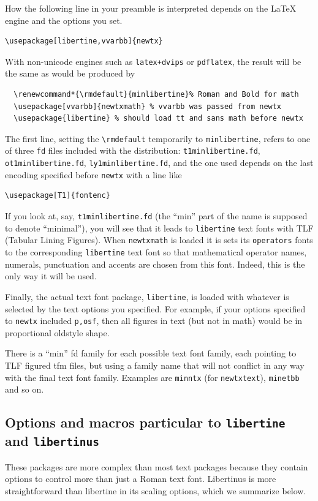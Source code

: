 \documentclass[\fsc]{article}
\theoremstyle{oldplain}
\theoremstyle{plain}
\begin{document}
How the following line in your preamble is interpreted depends on the LaTeX engine and the options you set. 
\begin{verbatim}
\usepackage[libertine,vvarbb]{newtx}
\end{verbatim}
With non-unicode engines such as {\tt latex+dvips} or {\tt pdflatex}, the result will be the same as would be produced by
\begin{verbatim}
  \renewcommand*{\rmdefault}{minlibertine}% Roman and Bold for math
  \usepackage[vvarbb]{newtxmath} % vvarbb was passed from newtx
  \usepackage{libertine} % should load tt and sans math before newtx
\end{verbatim}
The first line, setting the \verb|\rmdefault| temporarily to {\tt minlibertine}, refers to  one of three {\tt fd} files included with the distribution: {\tt t1minlibertine.fd}, {\tt ot1minlibertine.fd}, {\tt ly1minlibertine.fd}, and the one used depends on the last encoding specified before {\tt newtx} with a line like
\begin{verbatim}
\usepackage[T1]{fontenc}
\end{verbatim}
If you look at, say, {\tt t1minlibertine.fd} (the ``min'' part of the name is supposed to denote ``minimal''), you will see that it leads to {\tt libertine} text fonts with TLF (Tabular Lining Figures). When {\tt newtxmath} is loaded it is sets its {\tt operators} fonts to the corresponding {\tt libertine} text font so that mathematical operator names, numerals, punctuation and accents are chosen from this font. Indeed, this is the only way it will be used.

Finally, the actual text font package, {\tt libertine}, is loaded with whatever is selected by the text options you specified. For example, if your options specified to {\tt newtx} included {\tt p,osf}, then all figures in text (but not in math) would be in proportional oldstyle shape.

There is a ``min'' fd family for each possible text font family, each pointing to TLF figured tfm files, but using a family name that will not conflict in any way with the final text font family. Examples are {\tt minntx} (for {\tt newtxtext}), {\tt minetbb} and so on.

\subsection*{Options and macros particular to {\tt libertine} and {\tt libertinus}}

These packages are more complex than most text packages because they contain options to control more than just a Roman text font. Libertinus is more straightforward than libertine in its scaling options, which we summarize below.
\end{document}

